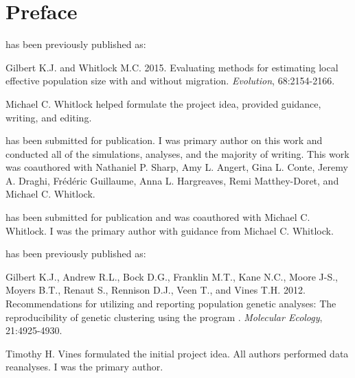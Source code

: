 \chapter*{Preface}


\textsc{} has been previously published as:
%
\begin{previouspaper}
  Gilbert K.J. and Whitlock M.C. 2015. Evaluating methods for estimating local effective 
  population size with and without migration. \emph{Evolution}, 68:2154-2166.
\end{previouspaper}
%
Michael C. Whitlock helped formulate the project idea, provided guidance, writing, and editing.

\textsc{} has been submitted for publication. %
I was primary author on this work and conducted all of the simulations, analyses, and the majority of writing. This work was coauthored with Nathaniel P. Sharp, Amy L. Angert, Gina L. Conte, Jeremy A. Draghi, Fr\'ed\'eric Guillaume, Anna L. Hargreaves, Remi Matthey-Doret, and Michael C. Whitlock.

\textsc{} has been submitted for publication and was coauthored with Michael C. Whitlock. I was the primary author with guidance from Michael C. Whitlock.

\textsc{} has been previously published as:
%
\begin{previouspaper}
  Gilbert K.J., Andrew R.L., Bock D.G., Franklin M.T., Kane N.C., Moore J-S., Moyers B.T., Renaut S., Rennison D.J., Veen T., and Vines T.H. 2012. Recommendations for utilizing and reporting population genetic analyses: The reproducibility of genetic clustering using the program . \emph{Molecular Ecology}, 21:4925-4930.
\end{previouspaper}
%
Timothy H. Vines formulated the initial project idea. All authors performed data reanalyses. I was the primary author.

